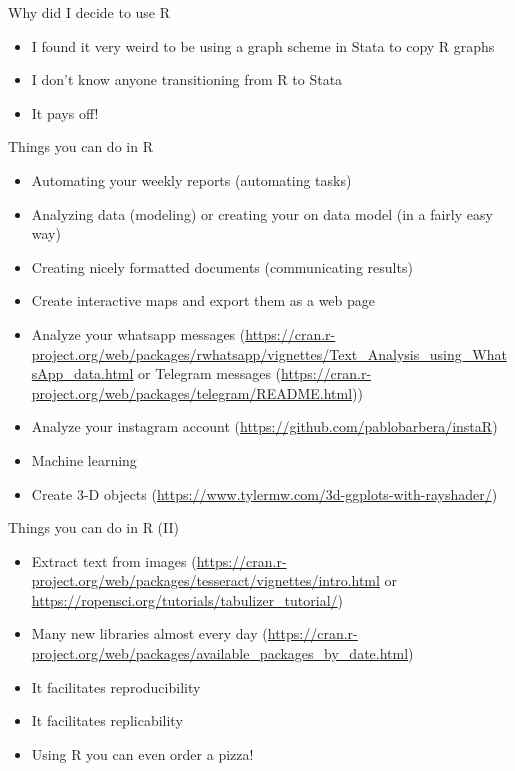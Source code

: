 \documentclass{beamer}
\begin{document}
\begin{frame}{Why did I decide to use R}
\begin{itemize}[<+->]
\item I found it very weird to be using a graph scheme in Stata to copy R graphs
\item I don't know anyone transitioning from R to Stata
\item It pays off!
 \end{itemize} 
\end{frame}

\begin{frame}{Things you can do in R}
\begin{itemize}[<+->]
\item Automating your weekly reports (automating tasks)
\item Analyzing data (modeling) or creating your on data model (in a fairly easy way)
\item Creating nicely formatted documents (communicating results)
\item Create interactive maps and export them as a web page
\item Analyze your whatsapp messages (\url{https://cran.r-project.org/web/packages/rwhatsapp/vignettes/Text_Analysis_using_WhatsApp_data.html} or Telegram messages (\url{https://cran.r-project.org/web/packages/telegram/README.html}))
\item Analyze your instagram account (\url{https://github.com/pablobarbera/instaR})
\item Machine learning
\item Create 3-D objects (\url{https://www.tylermw.com/3d-ggplots-with-rayshader/})
 \end{itemize} 
\end{frame}

\begin{frame}{Things you can do in R (II)}
\begin{itemize}[<+->]
\item Extract text from images (\url{https://cran.r-project.org/web/packages/tesseract/vignettes/intro.html} or \url{https://ropensci.org/tutorials/tabulizer_tutorial/})
\item Many new libraries almost every day (\url{https://cran.r-project.org/web/packages/available_packages_by_date.html})
\item It facilitates reproducibility
\item It facilitates replicability
\item Using R you can even order a pizza!
 \end{itemize} 
\end{frame}
\end{document}
